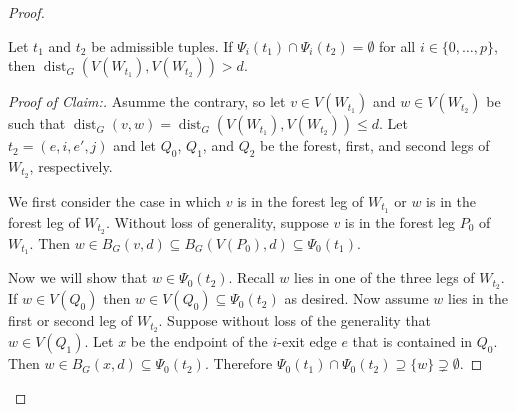 \documentclass{patmorin}
\newcommand{\pat}[1]{\textcolor{Blue}{Pat: #1}}
\newcommand{\piotr}[1]{\textcolor{red}{Piotr: #1}}
\newenvironment{clmproof}{\begin{proof}[Proof of Claim:]\renewcommand{\qedsymbol}{\rule{1ex}{1ex}}}{\end{proof}}
\DeclareMathOperator{\dist}{dist}
\begin{document}
\begin{proof}
\begin{clm}\label{w_distance}
  Let $t_1$ and $t_2$ be admissible tuples.
  If $\Psi_i(t_1)\cap \Psi_i(t_2)=\emptyset$ for all $i\in\{0,\ldots,p\}$, 
  then $\dist_G(V(W_{t_1}),V(W_{t_2}))> d$.  
\end{clm}



\begin{clmproof}
  Asumme the contrary, so let $v\in V(W_{t_1})$ and $w\in V(W_{t_2})$ be such that $\dist_G(v,w)=\dist_G(V(W_{t_1}),V(W_{t_2})) \le d$.
  Let $t_2=(e,i,e',j)$ and let $Q_0$, $Q_1$, and $Q_2$ be the forest, first, and second legs of $W_{t_2}$, respectively.

  We first consider the case in which $v$ is in the forest leg of $W_{t_1}$ or $w$ is in the forest leg of $W_{t_2}$.   Without loss of generality, suppose $v$ is in the forest leg $P_0$ of $W_{t_1}$. 
  Then $w\in B_G(v,d)\subseteq B_G(V(P_0),d)\subseteq\Psi_0(t_1)$.  

  Now we will show that $w\in \Psi_0(t_2)$. 
  Recall $w$ lies in one of the three legs of $W_{t_2}$. 
  If $w\in V(Q_0)$ then $w\in V(Q_0)\subseteq \Psi_0(t_2)$ as desired. 
  Now assume $w$ lies in the first or second leg of $W_{t_2}$.
  Suppose without loss of the generality that $w\in V(Q_1)$. 
  Let $x$ be the endpoint of the $i$-exit edge $e$ that is contained in $Q_0$.
  Then $w\in B_G(x,d)\subseteq\Psi_0(t_2)$.
  Therefore $\Psi_0(t_1)\cap\Psi_0(t_2)\supseteq\{w\}\supsetneq\emptyset$.


\end{clmproof}
\end{proof}
\end{document}
